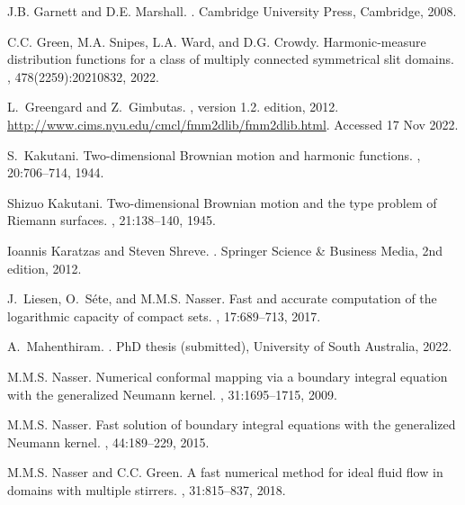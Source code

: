 \documentclass[11pt]{article}
\begin{document}
\begin{thebibliography}{10}
	J.B. Garnett and D.E. Marshall.
	.
	\newblock Cambridge University Press, Cambridge, 2008.
	
	C.C. Green, M.A. Snipes, L.A. Ward, and D.G. Crowdy.
	\newblock Harmonic-measure distribution functions for a class of multiply
	connected symmetrical slit domains.
	, 478(2259):20210832, 2022.
	
	L.~Greengard and Z.~Gimbutas.
	, version 1.2. edition, 2012.
	\newblock \url{http://www.cims.nyu.edu/cmcl/fmm2dlib/fmm2dlib.html}. Accessed
	17 Nov 2022.
	
	S.~Kakutani.
	\newblock Two-dimensional {B}rownian motion and harmonic functions.
	, 20:706--714, 1944.
	
	Shizuo Kakutani.
	\newblock Two-dimensional {B}rownian motion and the type problem of {R}iemann
	surfaces.
	, 21:138--140, 1945.
	
	Ioannis Karatzas and Steven Shreve.
	.
	\newblock Springer Science \& Business Media, 2nd edition, 2012.
	
	J.~Liesen, O.~S{\'e}te, and M.M.S. Nasser.
	\newblock Fast and accurate computation of the logarithmic capacity of compact
	sets.
	, 17:689--713, 2017.
	
	A.~Mahenthiram.
	.
	\newblock PhD thesis (submitted), University of South Australia, 2022.
	
	M.M.S. Nasser.
	\newblock Numerical conformal mapping via a boundary integral equation with the
	generalized {N}eumann kernel.
	, 31:1695--1715, 2009.
	
	M.M.S. Nasser.
	\newblock Fast solution of boundary integral equations with the generalized
	{N}eumann kernel.
	, 44:189--229, 2015.
	
	M.M.S. Nasser and C.C. Green.
	\newblock A fast numerical method for ideal fluid flow in domains with multiple
	stirrers.
	, 31:815--837, 2018.
	

\end{thebibliography}
\end{document}
